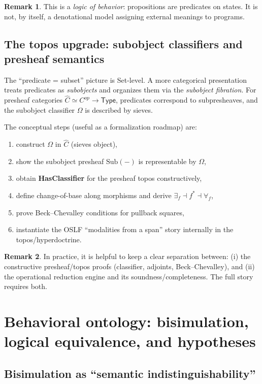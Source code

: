 \documentclass[11pt]{article}
\newcommand{\Psh}[1]{\widehat{#1}} %
\newcommand{\Sub}{\mathrm{Sub}}
\theoremstyle{definition}
\newtheorem{remark}{Remark}
\begin{document}
\begin{remark}
This is a \emph{logic of behavior}: propositions are predicates on states.
It is not, by itself, a denotational model assigning external meanings to programs.
\end{remark}

\subsection{The topos upgrade: subobject classifiers and presheaf semantics}

The ``predicate = subset'' picture is Set-level.
A more categorical presentation treats predicates as \emph{subobjects} and organizes them via the \emph{subobject fibration}.
For presheaf categories $\Psh{C} \simeq C^{op} \to \mathsf{Type}$, predicates correspond to subpresheaves,
and the subobject classifier $\Omega$ is described by sieves.

The conceptual steps (useful as a formalization roadmap) are:
\begin{enumerate}[leftmargin=1.5em]
\item construct $\Omega$ in $\Psh{C}$ (sieves object),
\item show the subobject presheaf $\Sub(-)$ is representable by $\Omega$,
\item obtain \textbf{HasClassifier} for the presheaf topos constructively,
\item define change-of-base along morphisms and derive $\exists_f \dashv f^* \dashv \forall_f$,
\item prove Beck--Chevalley conditions for pullback squares,
\item instantiate the OSLF ``modalities from a span'' story internally in the topos/hyperdoctrine.
\end{enumerate}

\begin{remark}
In practice, it is helpful to keep a clear separation between:
(i) the constructive presheaf/topos proofs (classifier, adjoints, Beck--Chevalley),
and (ii) the operational reduction engine and its soundness/completeness.
The full story requires both.
\end{remark}

\section{Behavioral ontology: bisimulation, logical equivalence, and hypotheses}

\subsection{Bisimulation as ``semantic indistinguishability''}
\end{document}
